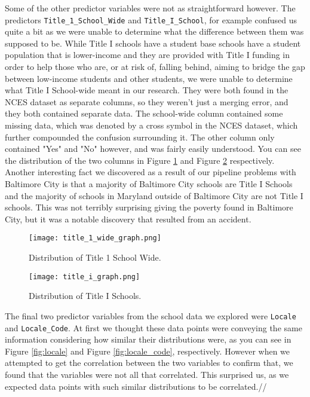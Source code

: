 \documentclass[12pt]{article}
\begin{document}
Some of the other predictor variables were not as straightforward however. The
predictors \texttt{Title\_1\_School\_Wide} and \texttt{Title\_I\_School},
for example confused us quite a bit as we were unable to determine what the 
difference between them was supposed to be. While Title I schools have a student
base schools have a student population that is lower-income and they are provided 
with Title I  funding in order to help those who are, or at risk of, falling behind, 
aiming to bridge the gap between low-income students and other students, we
were unable to determine what Title I School-wide meant in our research. They 
were both found in the NCES dataset as separate columns, so they weren't just a 
merging error, and they both contained separate data.\cite{nces2019} The school-wide 
column contained some missing data, which was denoted by a cross symbol in the 
NCES dataset, which further compounded the confusion surrounding it. The
other column only contained "Yes" and "No" however, and was fairly easily understood.
You can see the distribution of the two columns in Figure \ref{fig:title_1_wide}
and Figure \ref{fig:title_i} respectively.\\

Another interesting fact we discovered as a result of our pipeline problems with
Baltimore City is that a majority of Baltimore City schools are Title I Schools
and the majority of schools in Maryland outside of Baltimore City are not Title
I schools. This was not terribly surprising giving the poverty found in Baltimore
City, but it was a notable discovery that resulted from an accident.\\

\begin{figure}[!htb]
  \centering
  \texttt{[image: title\_1\_wide\_graph.png]}
  \caption{Distribution of Title 1 School Wide.}
  \label{fig:title_1_wide}
\end{figure}

\begin{figure}[!htb]
  \centering
  \texttt{[image: title\_i\_graph.png]}
  \caption{Distribution of Title I Schools.}
  \label{fig:title_i}
\end{figure}

The final two predictor variables from the school data we explored were \texttt{Locale}
and \texttt{Locale\_Code}. At first we thought these data points were conveying the
same information considering how similar their distributions were, as you can see in
Figure \ref{fig:locale} and Figure \ref{fig:locale_code}, respectively. However when
we attempted to get the correlation between the two variables to confirm that, we found
that the variables were not all that correlated. This surprised us, as we expected data
points with such similar distributions to be correlated.//
\end{document}
